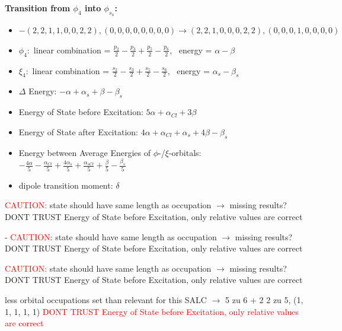 \documentclass[12pt,a4paper]{article}
\begin{document}
        \noindent\textbf{Transition from $\phi_{4}$ into $\phi_{s_{4}}$:}
        \begin{itemize}
            \item $- (2, 2, 1, 1, 0, 0, 2, 2), (0, 0, 0, 0, 0, 0, 0, 0) \rightarrow (2, 2, 1, 0, 0, 0, 2, 2), (0, 0, 0, 1, 0, 0, 0, 0)$
        
            \item $\phi_{4}:$ linear combination = $\frac{p_{2}}{2} - \frac{p_{3}}{2} + \frac{p_{5}}{2} - \frac{p_{6}}{2}$, \
            energy = $\alpha - \beta$
            
            \item $\xi_{4}:$ linear combination = $\frac{s_{2}}{2} - \frac{s_{3}}{2} + \frac{s_{5}}{2} - \frac{s_{6}}{2}$, \
            energy = $\alpha_{s} - \beta_{s}$
            
            \item $\Delta$ Energy: $- \alpha + \alpha_{s} + \beta - \beta_{s}$
            \item Energy of State before Excitation: $5 \alpha + \alpha_{Cl} + 3 \beta$
            \item Energy of State after Excitation: $4 \alpha + \alpha_{Cl} + \alpha_{s} + 4 \beta - \beta_{s}$
            \item Energy between Average Energies of $\phi$-/$\xi$-orbitals: \
            $- \frac{4 \alpha}{5} - \frac{\alpha_{Cl}}{5} + \frac{4 \alpha_{s}}{5} + \frac{\alpha_{s Cl}}{5} + \frac{\beta}{5} - \frac{\beta_{s}}{5}$
        
            \item dipole transition moment: $\delta$
        
        \end{itemize}
        
	\textcolor{red}{CAUTION:} state should have same length as occupation $\rightarrow$ missing results?
	DONT TRUST \glqq{}Energy of State before Excitation\grqq{}, only relative values are correct

 - 	\textcolor{red}{CAUTION:} state should have same length as occupation $\rightarrow$ missing results?
	DONT TRUST \glqq{}Energy of State before Excitation\grqq{}, only relative values are correct

	\textcolor{red}{CAUTION:} state should have same length as occupation $\rightarrow$ missing results?
	DONT TRUST \glqq{}Energy of State before Excitation\grqq{}, only relative values are correct

less orbital occupations set than relevant for this SALC $\rightarrow$ 
5 zu 6 + 2 
2 zu 5, (1, 1, 1, 1, 1) 
\textcolor{red}{DONT TRUST \glqq{}Energy of State before Excitation\grqq{}, only relative values are correct}
\end{document}
